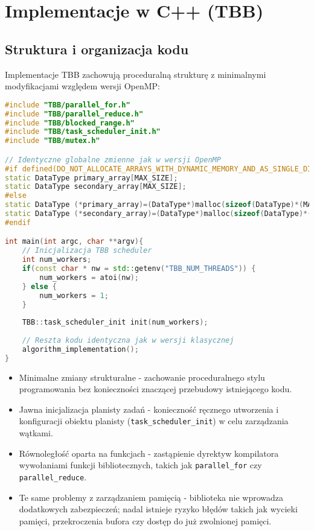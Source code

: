 \section{Implementacje w C++ (TBB)}
\subsection{Struktura i organizacja kodu}
Implementacje TBB zachowują proceduralną strukturę z minimalnymi modyfikacjami względem wersji OpenMP:
\begin{lstlisting}[language=C++, caption={Implementacja TBB - struktura kodu}, label={lst:TBB-structure}]
#include "TBB/parallel_for.h"
#include "TBB/parallel_reduce.h"
#include "TBB/blocked_range.h"
#include "TBB/task_scheduler_init.h"
#include "TBB/mutex.h"

// Identyczne globalne zmienne jak w wersji OpenMP
#if defined(DO_NOT_ALLOCATE_ARRAYS_WITH_DYNAMIC_MEMORY_AND_AS_SINGLE_DIMENSION)
static DataType primary_array[MAX_SIZE];
static DataType secondary_array[MAX_SIZE];
#else
static DataType (*primary_array)=(DataType*)malloc(sizeof(DataType)*(MAX_SIZE));
static DataType (*secondary_array)=(DataType*)malloc(sizeof(DataType)*(MAX_SIZE));
#endif

int main(int argc, char **argv){
    // Inicjalizacja TBB scheduler
    int num_workers;
    if(const char * nw = std::getenv("TBB_NUM_THREADS")) {
        num_workers = atoi(nw);
    } else {
        num_workers = 1;
    }
    
    TBB::task_scheduler_init init(num_workers);
    
    // Reszta kodu identyczna jak w wersji klasycznej
    algorithm_implementation();
}
\end{lstlisting}
\begin{itemize}
    \item Minimalne zmiany strukturalne - zachowanie proceduralnego stylu programowania bez konieczności znaczącej przebudowy istniejącego kodu.
    
    \item Jawna inicjalizacja planisty zadań - konieczność ręcznego utworzenia i konfiguracji obiektu planisty (\texttt{task\_scheduler\_init}) w celu zarządzania wątkami.
    
    \item Równoległość oparta na funkcjach - zastąpienie dyrektyw kompilatora wywołaniami funkcji bibliotecznych, takich jak \texttt{parallel\_for} czy \texttt{parallel\_reduce}.
    
    \item Te same problemy z zarządzaniem pamięcią - biblioteka nie wprowadza dodatkowych zabezpieczeń; nadal istnieje ryzyko błędów takich jak wycieki pamięci, przekroczenia bufora czy dostęp do już zwolnionej pamięci.
\end{itemize}
  
